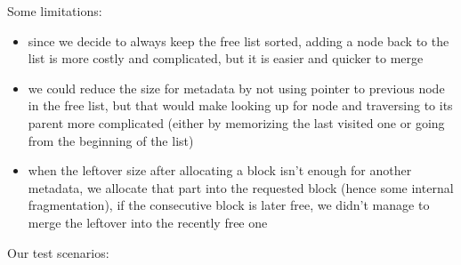 \documentclass{article}
\begin{document}
\begin{flushleft}
Some limitations:
\end{flushleft}

\begin{itemize}
\item since we decide to always keep the free list sorted, adding a node back to the list is more costly and complicated, but it is easier and quicker to merge
\item we could reduce the size for metadata by not using pointer to previous node in the free list, but that would make looking up for node and traversing to its parent more complicated (either by memorizing the last visited one or going from the beginning of the list)
\item when the leftover size after allocating a block isn't enough for another metadata, we allocate that part into the requested block (hence some internal fragmentation), if the consecutive block is later free, we didn't manage to merge the leftover into the recently free one
\end{itemize}

\begin{flushleft}
Our test scenarios:
\end{flushleft}
\end{document}
